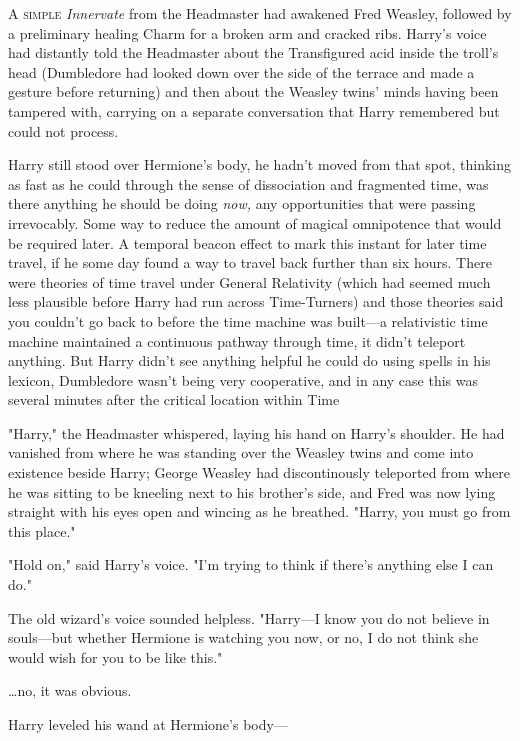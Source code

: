 
\lettrine{A}{ simple}
\emph{Innervate} from the Headmaster had awakened Fred Weasley, followed by a
preliminary healing Charm for a broken arm and cracked ribs. Harry's voice had
distantly told the Headmaster about the Transfigured acid inside the troll's
head (Dumbledore had looked down over the side of the terrace and made a
gesture before returning) and then about the Weasley twins' minds having been
tampered with, carrying on a separate conversation that Harry remembered but
could not process.

Harry still stood over Hermione's body, he hadn't moved from that spot,
thinking as fast as he could through the sense of dissociation and fragmented
time, was there anything he should be doing \emph{now,} any opportunities that
were passing irrevocably. Some way to reduce the amount of magical omnipotence
that would be required later. A temporal beacon effect to mark this instant for
later time travel, if he some day found a way to travel back further than six
hours. There were theories of time travel under General Relativity (which had
seemed much less plausible before Harry had run across Time-Turners) and those
theories said you couldn't go back to before the time machine was built---a
relativistic time machine maintained a continuous pathway through time, it
didn't teleport anything. But Harry didn't see anything helpful he could do
using spells in his lexicon, Dumbledore wasn't being very cooperative, and in
any case this was several minutes after the critical location within Time

"Harry," the Headmaster whispered, laying his hand on Harry's shoulder. He had
vanished from where he was standing over the Weasley twins and come into
existence beside Harry; George Weasley had discontinously teleported from where
he was sitting to be kneeling next to his brother's side, and Fred was now
lying straight with his eyes open and wincing as he breathed. "Harry, you must
go from this place."

"Hold on," said Harry's voice. "I'm trying to think if there's anything else I
can do."

The old wizard's voice sounded helpless. "Harry---I know you do not believe in
souls---but whether Hermione is watching you now, or no, I do not think she
would wish for you to be like this."

{\ldots}no, it was obvious.

Harry leveled his wand at Hermione's body---

